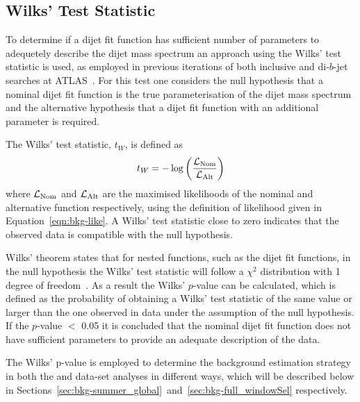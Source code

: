 \subsection{Wilks' Test Statistic} 
\label{sec:bkg-wilks}

To determine if a dijet fit function has sufficient number of parameters to adequetely describe the dijet mass spectrum an approach using the Wilks' test statistic is used,
as employed in previous iterations of both inclusive and di-$b$-jet searches at ATLAS~\cite{dijet-mori16_paper,dibjet-mori16_paper}.
For this test one considers the null hypothesis that a nominal dijet fit function is the true parameterisation of the dijet mass spectrum
and the alternative hypothesis that a dijet fit function with an additional parameter is required.

\noindent
The Wilks' test statistic, $t_W$, is defined as
\begin{equation}
  t_{W} = -\log{\left(\frac{\ensuremath{\mathcal{L}}_{\text{Nom}}}{\ensuremath{\mathcal{L}}_{\text{Alt}}}\right)}  \label{eqn:bkg-wilks}
\end{equation}
where $\mathcal{L}_{\text{Nom}}$ and $\mathcal{L}_{\text{Alt}}$ are the maximised likelihoods of the nominal and alternative function respectively,
using the definition of likelihood given in Equation~\ref{eqn:bkg-like}.
A Wilks' test statistic close to zero indicates that the observed data is compatible with the null hypothesis.

Wilks' theorem states that for nested functions, such as the dijet fit functions,
in the null hypothesis the Wilks' test statistic will follow a $\chi^2$ distribution with 1 degree of freedom~\cite{dibjet-wilks}.
As a result the Wilks' $p$-value can be calculated, which is defined as the probability of obtaining a
Wilks' test statistic of the same value or larger than the one observed in data under the assumption of the null hypothesis.
If the \mbox{$p$-value} $<$ 0.05 it is concluded that the nominal dijet fit function does not have sufficient
parameters to provide an adequate description of the data.

The Wilks' p-value is employed to determine the background estimation strategy
in both the \summer{} and \lm{} data-set analyses in different ways,
which will be described below in Sections~\ref{sec:bkg-summer_global}~and~\ref{sec:bkg-full_windowSel} respectively.

